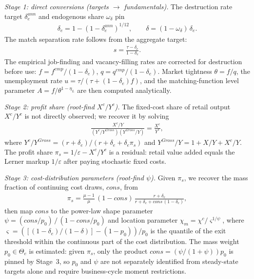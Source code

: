 \documentclass[authoryear, review, 12pt]{elsarticle}
\begin{document}
	\medskip\noindent\textit{Stage 1: direct conversions (targets $\to$ fundamentals).}
	The destruction rate target $\delta_e^{ann}$ and endogenous share $\omega_\delta$
	pin
	\begin{align}
		\delta_e = 1-(1-\delta_e^{ann})^{1/12}, \qquad
		\delta   = (1-\omega_\delta)\,\delta_e.
	\end{align}
	The match separation rate follows from the aggregate target:
	\begin{align}
		s = \frac{\tau - \delta_e}{1-\delta_e}.
	\end{align}
	The empirical job-finding and vacancy-filling rates are corrected for destruction
	before use: $f=f^{emp}/(1-\delta_e)$, $q=q^{emp}/(1-\delta_e)$.
	Market tightness $\theta=f/q$, the unemployment rate
	$u=\tau/(\tau+(1-\delta_e)f)$, and the matching-function level parameter
	$A=f/\theta^{1-\eta_L}$ are then computed analytically.
	
	\medskip\noindent\textit{Stage 2: profit share (root-find $X^c/Y^c$).}
	The fixed-cost share of retail output $X^c/Y^c$ is not directly observed; we
	recover it by solving
	\begin{align}\label{eq:calib_stage2}
		\frac{X^c/Y}{(Y^c/Y^{Gross})(Y^{Gross}/Y)} = \frac{X^c}{Y^c},
	\end{align}
	where $Y^c/Y^{Gross}=(r+\delta_e)/(r+\delta_e+\delta_e\pi_s)$ and
	$Y^{Gross}/Y=1+X/Y+X^c/Y$. The profit share $\pi_s=1/\varepsilon - X^c/Y^c$
	is a residual: retail value added equals the Lerner markup $1/\varepsilon$
	after paying stochastic fixed costs.
	
	\medskip\noindent\textit{Stage 3: cost-distribution parameters (root-find $\psi$).}
	Given $\pi_s$, we recover the mass fraction of continuing cost draws,
	$\mathit{cons}$, from
	\begin{align}\label{eq:calib_stage3}
		\pi_s = \frac{\mu-1}{\mu}\,(1-\mathit{cons})\,
		\frac{r+\delta_e}{r+\delta_e+\mathit{cons}\,(1-\delta_e)},
	\end{align}
	then map $\mathit{cons}$ to the power-law shape parameter
	$\psi = (\mathit{cons}/p_0)\,/\,(1-\mathit{cons}/p_0)$
	and location parameter $\chi_m = \chi^c/\varsigma^{1/\psi}$, where
	$\varsigma=([(1-\delta_e)/(1-\delta)]-(1-p_0))/p_0$ is the quantile of the exit
	threshold within the continuous part of the cost distribution. The mass weight
	$p_0\in\Theta_e$ is estimated: given $\pi_s$, only the product $\mathit{cons}=(\psi/(1+\psi))p_0$
	is pinned by Stage~3, so $p_0$ and $\psi$ are not separately identified from
	steady-state targets alone and require business-cycle moment restrictions.
	
\end{document}
